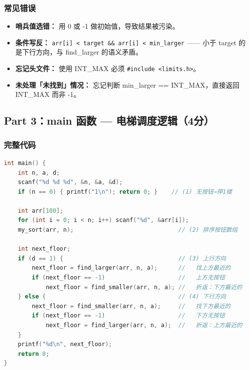 \subsubsection{常见错误}

\begin{itemize}
    \item \textbf{哨兵值选错：} 用 0 或 -1 做初始值，导致结果被污染。
    \item \textbf{条件写反：} \texttt{arr[i] < target \&\& arr[i] < min\_larger} —— 小于 target 的是下行方向，与 find\_larger 的语义矛盾。
    \item \textbf{忘记头文件：} 使用 INT\_MAX 必须 \texttt{\#include <limits.h>}。
    \item \textbf{未处理「未找到」情况：} 忘记判断 min\_larger == INT\_MAX，直接返回 INT\_MAX 而非 -1。
\end{itemize}

\bigskip
\bigskip

\subsection{Part 3：main 函数 — 电梯调度逻辑（4分）}

\subsubsection{完整代码}

\begin{lstlisting}[language=C]
int main() {
    int n, a, d;
    scanf("%d %d %d", &n, &a, &d);
    if (n == 0) { printf("1\n"); return 0; }    // (1) 无按钮→停1楼

    int arr[100];
    for (int i = 0; i < n; i++) scanf("%d", &arr[i]);
    my_sort(arr, n);                              // (2) 排序按钮数组

    int next_floor;
    if (d == 1) {                                 // (3) 上行方向
        next_floor = find_larger(arr, n, a);      //   找上方最近的
        if (next_floor == -1)                     //   上方无按钮
            next_floor = find_smaller(arr, n, a); //   折返：下方最近的
    } else {                                      // (4) 下行方向
        next_floor = find_smaller(arr, n, a);     //   找下方最近的
        if (next_floor == -1)                     //   下方无按钮
            next_floor = find_larger(arr, n, a);  //   折返：上方最近的
    }
    printf("%d\n", next_floor);
    return 0;
}
\end{lstlisting}

